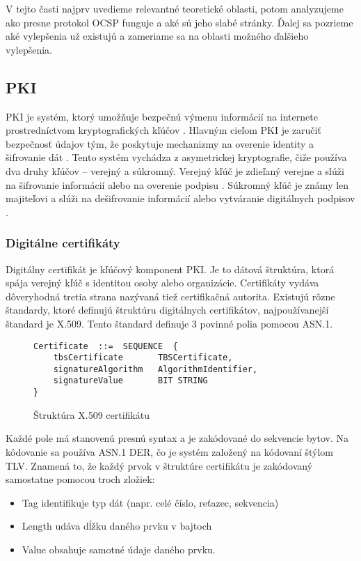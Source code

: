 \documentclass[12pt, twoside]{book}
\begin{document}
V tejto časti najprv uvedieme relevantné teoretické oblasti, potom analyzujeme ako presne protokol OCSP funguje a aké sú jeho slabé stránky. Ďalej sa pozrieme aké  vylepšenia už existujú a zameriame sa na oblasti možného ďalšieho vylepšenia.

\subsection{PKI}
PKI je systém, ktorý umožňuje bezpečnú výmenu informácií na internete prostredníctvom kryptografických kľúčov \cite{pki}. Hlavným cieľom PKI je zaručiť bezpečnosť údajov tým, že poskytuje mechanizmy na overenie identity a šifrovanie dát \cite{pki2}. Tento systém vychádza z asymetrickej kryptografie, čiže používa dva druhy kľúčov – verejný a súkromný. Verejný kľúč je zdieľaný verejne a slúži na šifrovanie informácií alebo na overenie podpisu \cite{pki}. Súkromný kľúč je známy len majiteľovi a slúži na dešifrovanie informácií alebo vytváranie digitálnych podpisov \cite{pki2}.


\subsubsection{Digitálne certifikáty}
Digitálny certifikát je kľúčový komponent PKI.\cite{certs} Je to dátová štruktúra, ktorá spája verejný kľúč s identitou osoby alebo organizácie. Certifikáty vydáva dôveryhodná tretia strana nazývaná tiež certifikačná autorita. Existujú rôzne štandardy, ktoré definujú štruktúru digitálnych certifikátov, najpoužívanejší štandard je X.509.\cite{certs} Tento štandard definuje 3 povinné polia pomocou ASN.1.\cite{x509}

\begin{figure}[H]
\begin{lstlisting}
Certificate  ::=  SEQUENCE  {
    tbsCertificate       TBSCertificate,
    signatureAlgorithm   AlgorithmIdentifier,
    signatureValue       BIT STRING
}
\end{lstlisting}
\caption{Štruktúra X.509 certifikátu}
\end{figure}

Každé pole má stanovenú presnú syntax a je zakódované do sekvencie bytov. Na kódovanie sa používa ASN.1 DER, čo je systém založený na kódovaní štýlom TLV. Znamená to, že každý prvok v štruktúre certifikátu je zakódovaný samostatne pomocou troch zložiek:\cite{asn1}
\begin{itemize}
\item Tag identifikuje typ dát (napr. celé číslo, reťazec, sekvencia)
\item Length udáva dĺžku daného prvku v bajtoch
\item Value obsahuje samotné údaje daného prvku.
\end{itemize}
\end{document}
